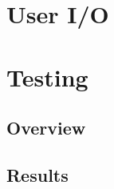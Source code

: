 \documentclass[main.tex]{subfiles}
\begin{document}
\section{User I/O}
\section{Testing}
\subsection{Overview}
\subsection{Results}
\end{document}
